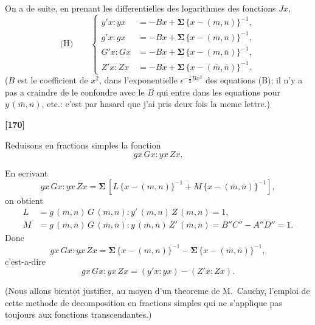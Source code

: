 \documentclass[11pt,a4paper]{book}
\begin{document}
On a de suite, en prenant les differentielles des logarithmes des fonctions $Jx$,
\begin{equation*}
\text{(H)}\qquad
\left\{
\begin{aligned}
y'x : yx &= -Bx + \boldsymbol{\Sigma}\, \{x - (m, n)\}^{-1},\\
g'x : gx &= -Bx + \boldsymbol{\Sigma}\, \{x - (\bar{m}, n)\}^{-1},\\
G'x : Gx &= -Bx + \boldsymbol{\Sigma}\, \{x - (m, \bar{n})\}^{-1},\\
Z'x : Zx &= -Bx + \boldsymbol{\Sigma}\, \{x - (\bar{m}, \bar{n})\}^{-1}.
\end{aligned}
\right.
\end{equation*}
($B$ est le coefficient de $x^2$, dans l'exponentielle $\epsilon^{-\frac{1}{2}Bx^2}$ des equations (B); il n'y a pas
a craindre de le confondre avec le $B$ qui entre dans les equations pour $y\, (\bar{m}, n)$, etc.:
c'est par hasard que j'ai pris deux fois la meme lettre.)

\textbf{[170]}

Reduisons en fractions simples la fonction
\[gx\, Gx : yx\, Zx.\]

En ecrivant
\[gx\, Gx : yx\, Zx = \boldsymbol{\Sigma}\, [L\, \{x - (m, n)\}^{-1} + M\, \{x - (\bar{m}, \bar{n})\}^{-1}],\]
on obtient
\begin{align*}
L &= g\, (m, n)\, G\, (m, n) : y'\, (m, n)\, Z\, (m, n) = 1,\\
M &= g\, (\bar{m}, \bar{n})\, G\, (\bar{m}, \bar{n}) : y\, (\bar{m}, \bar{n})\, Z'\, (\bar{m}, \bar{n}) = B''C'' - A''D'' = 1.
\end{align*}
Donc
\[gx\, Gx : yx\, Zx = \boldsymbol{\Sigma}\, \{x - (m, n)\}^{-1} - \boldsymbol{\Sigma}\, \{x - (\bar{m}, \bar{n})\}^{-1},\]
c'est-a-dire
\[gx\, Gx : yx\, Zx = (y'x : yx) - (Z'x : Zx).\]

(Nous allons bientot justifier, au moyen d'un theoreme de M.~Cauchy, l'emploi de
cette methode de decomposition en fractions simples qui ne s'applique pas toujours aux
fonctions transcendantes.)
\end{document}
